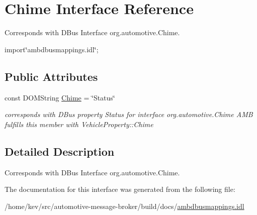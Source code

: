 \hypertarget{interfaceChime}{\section{Chime Interface Reference}
\label{interfaceChime}
}


Corresponds with D\+Bus Interface org.\+automotive.\+Chime.  




{\ttfamily import\char`\"{}ambdbusmappings.\+idl\char`\"{};}

\subsection*{Public Attributes}
\begin{DoxyCompactItemize}
\item 
\hypertarget{interfaceChime_a8c3a90e6372ac2fbef175e5b11d629a1}{const D\+O\+M\+String \hyperlink{interfaceChime_a8c3a90e6372ac2fbef175e5b11d629a1}{Chime} = \char`\"{}Status\char`\"{}}\label{interfaceChime_a8c3a90e6372ac2fbef175e5b11d629a1}

\begin{DoxyCompactList}\small\item\em corresponds with D\+Bus property Status for interface org.\+automotive.\+Chime A\+M\+B fulfills this member with Vehicle\+Property\+::\+Chime \end{DoxyCompactList}\end{DoxyCompactItemize}


\subsection{Detailed Description}
Corresponds with D\+Bus Interface org.\+automotive.\+Chime. 

The documentation for this interface was generated from the following file\+:\begin{DoxyCompactItemize}
\item 
/home/kev/src/automotive-\/message-\/broker/build/docs/\hyperlink{ambdbusmappings_8idl}{ambdbusmappings.\+idl}\end{DoxyCompactItemize}
